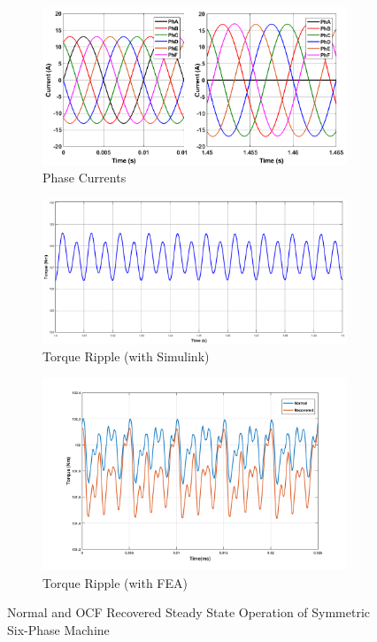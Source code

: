\documentclass[a4paper,11pt]{article}
\begin{document}
\begin{figure}[ht!]
\begin{subfigure}[b]{0.33\textwidth}
    \centering
    \includegraphics[width=\linewidth]{c1.png}
    \caption{Phase Currents}
    \label{fig:ocfcurrent}    
\end{subfigure}
\begin{subfigure}[b]{0.33\textwidth}
    \centering
    \includegraphics[width=\linewidth]{ss_recover_torque.png}
    \caption{Torque Ripple (with Simulink)}
    \label{fig:ocftorque}    
\end{subfigure}
\begin{subfigure}[b]{0.33\textwidth}
    \centering
    \includegraphics[width=\linewidth]{ss_recover_torque_fea2.png}
    \caption{Torque Ripple (with FEA)}
    \label{fig:ocftorquefea}   
\end{subfigure}
 \caption{Normal and OCF Recovered Steady State Operation of Symmetric Six-Phase Machine}
 \label{fig:ocfresponse}
\end{figure}
\end{document}
